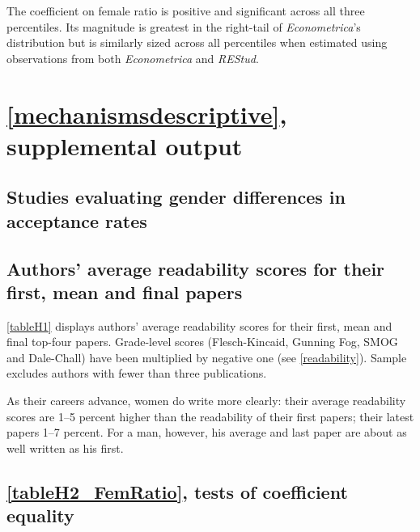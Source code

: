 \begin{appendices}
\begin{refsection}
The coefficient on female ratio is positive and significant across all three percentiles. Its magnitude is greatest in the right-tail of \emph{Econometrica}'s distribution but is similarly sized across all percentiles when estimated using observations from both \emph{Econometrica} and \emph{REStud}.



\clearpage


\section{\autoref{mechanismsdescriptive}, supplemental output}
\label{appendixseumatching}

\subsection{Studies evaluating gender differences in acceptance rates}
\label{appendixacceptance}



\clearpage


\subsection{Authors' average readability scores for their first, mean and final papers}
\label{appendixseuempirical}

\autoref{tableH1} displays authors' average readability scores for their first, mean and final top-four papers. Grade-level scores (Flesch-Kincaid, Gunning Fog, SMOG and Dale-Chall) have been multiplied by negative one (see \autoref{readability}). Sample excludes authors with fewer than three publications.

As their careers advance, women do write more clearly: their average readability scores are 1--5 percent higher than the readability of their first papers; their latest papers 1--7 percent. For a man, however, his average and last paper are about as well written as his first.



\clearpage


\subsection{\autoref{tableH2_FemRatio}, tests of coefficient equality}
\label{appendixequality}


\end{refsection}
\end{appendices}
